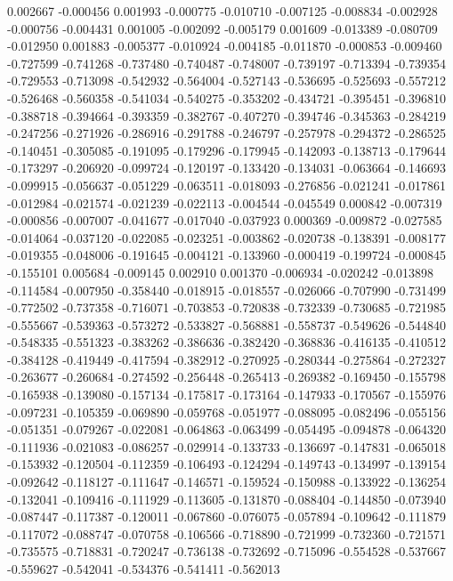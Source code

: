 0.002667
-0.000456
0.001993
-0.000775
-0.010710
-0.007125
-0.008834
-0.002928
-0.000756
-0.004431
0.001005
-0.002092
-0.005179
0.001609
-0.013389
-0.080709
-0.012950
0.001883
-0.005377
-0.010924
-0.004185
-0.011870
-0.000853
-0.009460
-0.727599
-0.741268
-0.737480
-0.740487
-0.748007
-0.739197
-0.713394
-0.739354
-0.729553
-0.713098
-0.542932
-0.564004
-0.527143
-0.536695
-0.525693
-0.557212
-0.526468
-0.560358
-0.541034
-0.540275
-0.353202
-0.434721
-0.395451
-0.396810
-0.388718
-0.394664
-0.393359
-0.382767
-0.407270
-0.394746
-0.345363
-0.284219
-0.247256
-0.271926
-0.286916
-0.291788
-0.246797
-0.257978
-0.294372
-0.286525
-0.140451
-0.305085
-0.191095
-0.179296
-0.179945
-0.142093
-0.138713
-0.179644
-0.173297
-0.206920
-0.099724
-0.120197
-0.133420
-0.134031
-0.063664
-0.146693
-0.099915
-0.056637
-0.051229
-0.063511
-0.018093
-0.276856
-0.021241
-0.017861
-0.012984
-0.021574
-0.021239
-0.022113
-0.004544
-0.045549
0.000842
-0.007319
-0.000856
-0.007007
-0.041677
-0.017040
-0.037923
0.000369
-0.009872
-0.027585
-0.014064
-0.037120
-0.022085
-0.023251
-0.003862
-0.020738
-0.138391
-0.008177
-0.019355
-0.048006
-0.191645
-0.004121
-0.133960
-0.000419
-0.199724
-0.000845
-0.155101
0.005684
-0.009145
0.002910
0.001370
-0.006934
-0.020242
-0.013898
-0.114584
-0.007950
-0.358440
-0.018915
-0.018557
-0.026066
-0.707990
-0.731499
-0.772502
-0.737358
-0.716071
-0.703853
-0.720838
-0.732339
-0.730685
-0.721985
-0.555667
-0.539363
-0.573272
-0.533827
-0.568881
-0.558737
-0.549626
-0.544840
-0.548335
-0.551323
-0.383262
-0.386636
-0.382420
-0.368836
-0.416135
-0.410512
-0.384128
-0.419449
-0.417594
-0.382912
-0.270925
-0.280344
-0.275864
-0.272327
-0.263677
-0.260684
-0.274592
-0.256448
-0.265413
-0.269382
-0.169450
-0.155798
-0.165938
-0.139080
-0.157134
-0.175817
-0.173164
-0.147933
-0.170567
-0.155976
-0.097231
-0.105359
-0.069890
-0.059768
-0.051977
-0.088095
-0.082496
-0.055156
-0.051351
-0.079267
-0.022081
-0.064863
-0.063499
-0.054495
-0.094878
-0.064320
-0.111936
-0.021083
-0.086257
-0.029914
-0.133733
-0.136697
-0.147831
-0.065018
-0.153932
-0.120504
-0.112359
-0.106493
-0.124294
-0.149743
-0.134997
-0.139154
-0.092642
-0.118127
-0.111647
-0.146571
-0.159524
-0.150988
-0.133922
-0.136254
-0.132041
-0.109416
-0.111929
-0.113605
-0.131870
-0.088404
-0.144850
-0.073940
-0.087447
-0.117387
-0.120011
-0.067860
-0.076075
-0.057894
-0.109642
-0.111879
-0.117072
-0.088747
-0.070758
-0.106566
-0.718890
-0.721999
-0.732360
-0.721571
-0.735575
-0.718831
-0.720247
-0.736138
-0.732692
-0.715096
-0.554528
-0.537667
-0.559627
-0.542041
-0.534376
-0.541411
-0.562013
